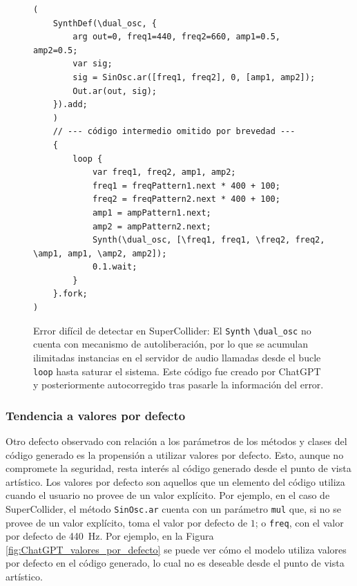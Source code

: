 \begin{figure}[H]
    \caption[Error difícil de detectar en SuperCollider]{Error difícil de detectar en SuperCollider: El \texttt{Synth} \texttt{\textbackslash dual\_osc} no cuenta con mecanismo de autoliberación, por lo que se acumulan ilimitadas instancias en el servidor de audio llamadas desde el bucle \texttt{loop} hasta saturar el sistema. Este código fue creado por ChatGPT y posteriormente autocorregido tras pasarle la información del error.}
    \centering
    \begin{lstlisting}[style=SuperCollider-IDE, basicstyle=\footnotesize\ttfamily, numbers=none]
(
    SynthDef(\dual_osc, {
        arg out=0, freq1=440, freq2=660, amp1=0.5, amp2=0.5;
        var sig;
        sig = SinOsc.ar([freq1, freq2], 0, [amp1, amp2]);
        Out.ar(out, sig);
    }).add;
    )
    // --- código intermedio omitido por brevedad ---
    {
        loop {
            var freq1, freq2, amp1, amp2;
            freq1 = freqPattern1.next * 400 + 100;
            freq2 = freqPattern2.next * 400 + 100;
            amp1 = ampPattern1.next;
            amp2 = ampPattern2.next;
            Synth(\dual_osc, [\freq1, freq1, \freq2, freq2, \amp1, amp1, \amp2, amp2]);
            0.1.wait;
        }
    }.fork;
)
    \end{lstlisting}
    \source{\propio}
    \label{fig:error_dificil_detectar_supercollider}
\end{figure}

\subsubsection{Tendencia a valores {por defecto}}
Otro defecto observado con relación a los parámetros de los métodos y clases del código generado es la propensión a utilizar valores por defecto. Esto, aunque no compromete la seguridad, resta interés al código generado desde el punto de vista artístico. Los valores por defecto son aquellos que un elemento del código utiliza cuando el usuario no provee de un valor explícito. Por ejemplo, en el caso de SuperCollider, el método \texttt{SinOsc.ar} cuenta con un parámetro \texttt{mul} que, si no se provee de un valor explícito, toma el valor por defecto de $1$; o \texttt{freq}, con el valor por defecto de \SI{440}{\hertz}. Por ejemplo, en la Figura \ref{fig:ChatGPT_valores_por_defecto} se puede ver cómo el modelo utiliza valores por defecto en el código generado, lo cual no es deseable desde el punto de vista artístico.

